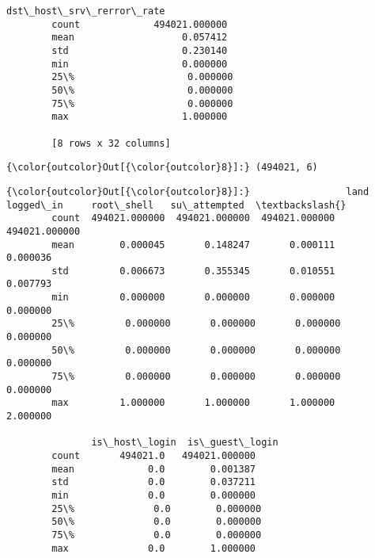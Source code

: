 \documentclass[11pt]{article}
\begin{document}
\begin{Verbatim}[commandchars=\\\{\}]
               dst\_host\_srv\_rerror\_rate  
        count             494021.000000  
        mean                   0.057412  
        std                    0.230140  
        min                    0.000000  
        25\%                    0.000000  
        50\%                    0.000000  
        75\%                    0.000000  
        max                    1.000000  
        
        [8 rows x 32 columns]
\end{Verbatim}
            
\begin{Verbatim}[commandchars=\\\{\}]
{\color{outcolor}Out[{\color{outcolor}8}]:} (494021, 6)
\end{Verbatim}
            
\begin{Verbatim}[commandchars=\\\{\}]
{\color{outcolor}Out[{\color{outcolor}8}]:}                 land      logged\_in     root\_shell   su\_attempted  \textbackslash{}
        count  494021.000000  494021.000000  494021.000000  494021.000000   
        mean        0.000045       0.148247       0.000111       0.000036   
        std         0.006673       0.355345       0.010551       0.007793   
        min         0.000000       0.000000       0.000000       0.000000   
        25\%         0.000000       0.000000       0.000000       0.000000   
        50\%         0.000000       0.000000       0.000000       0.000000   
        75\%         0.000000       0.000000       0.000000       0.000000   
        max         1.000000       1.000000       1.000000       2.000000   
        
               is\_host\_login  is\_guest\_login  
        count       494021.0   494021.000000  
        mean             0.0        0.001387  
        std              0.0        0.037211  
        min              0.0        0.000000  
        25\%              0.0        0.000000  
        50\%              0.0        0.000000  
        75\%              0.0        0.000000  
        max              0.0        1.000000  
\end{Verbatim}
            
\end{document}
